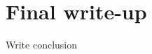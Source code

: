 \documentclass[12pt]{article}
\begin{document}


\section*{Final write-up}
	\begin{coi}
		\item Write conclusion
	\end{coi}
\end{document}
